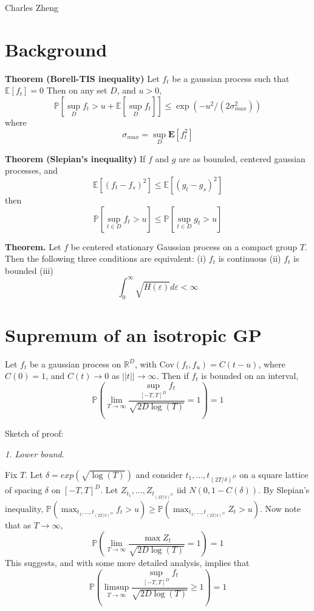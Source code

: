 \documentclass[11pt]{article}
\begin{document}
\newcommand{\tr}{\text{tr}}
\newcommand{\E}{\textbf{E}}
\newcommand{\diag}{\text{diag}}
\newcommand{\argmax}{\text{argmax}}
\newcommand{\Cov}{\text{Cov}}

Charles Zheng

\section{Background}

\noindent\textbf{Theorem (Borell-TIS inequality)}
Let $f_t$ be a gaussian process such that $\mathbb{E}[f_t] = 0$
Then on any set $D$, and $u > 0$, 
\[
\mathbb{P}[\sup_D f_t > u + \mathbb{E}[\sup_D f_t]] \leq \exp(-u^2/(2\sigma_{max}^2))
\]
where
\[
\sigma_{max} = \sup_D \E[f_t^2]
\]

\noindent\textbf{Theorem (Slepian's inequality)}
If $f$ and $g$ are as bounded, centered gaussian processes, and
\[
\mathbb{E}[(f_t-f_s)^2] \leq \mathbb{E}[(g_t-g_s)^2]
\]
then
\[
\mathbb{P}[\sup_{t \in D} f_t  > u] \leq \mathbb{P}[\sup_{t \in D} g_t  > u]
\]

\noindent\textbf{Theorem.} Let $f$ be centered stationary Gaussian
process on a compact group $T$. Then the following three conditions
are equivalent: (i) $f_t$ is continuous (ii) $f_t$ is bounded (iii)
\[
\int_0^\infty \sqrt{H(\varepsilon)} d\varepsilon < \infty 
\]


\section{Supremum of an isotropic GP}

Let $f_t$ be a gaussian process on $\mathbb{R}^D$, with $\Cov(f_t,f_u)
= C(t-u)$, where $C(0) = 1$, and $C(t) \to 0$ as $||t|| \to \infty$.
Then if $f_t$ is bounded on an interval,
\[
\mathbb{P}\left(\lim_{T \to \infty}\frac{\sup_{[-T,T]^D}
    f_t}{\sqrt{2D\log(T)}} = 1
\right) = 1
\]

Sketch of proof:

\emph{1. Lower bound}.

Fix $T$. Let $\delta =exp(\sqrt{\log(T)})$ and consider
$t_1,...,t_{(2T/\delta)^D}$ on a square lattice of spacing $\delta$ on
$[-T,T]^D$.  Let $Z_{t_1},\hdots, Z_{t_{(2T/\delta)^D}}$ iid
$N(0,1-C(\delta))$.  By Slepian's inequality,
$\mathbb{P}(\max_{t_1,\hdots,t_{(2T/\delta)^D}} f_t > u) \geq
\mathbb{P}(\max_{t_1,\hdots,t_{(2T/\delta)^D}} Z_t > u)$.  Now note
that as $T \to \infty$, 
\[
\mathbb{P}\left(\lim_{T \to \infty}\frac{\max
    Z_t}{\sqrt{2D\log(T)}} = 1
\right) = 1
\]
This suggests, and with some more detailed analysis, implies that
\[
\mathbb{P}\left(\limsup_{T \to \infty}\frac{\sup_{[-T,T]^D}
    f_t}{\sqrt{2D\log(T)}} \geq 1
\right) = 1
\]
\end{document}

